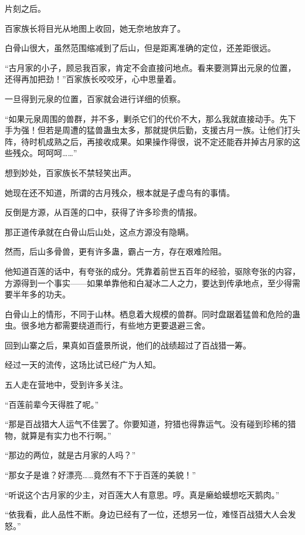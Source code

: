 
\begin{this_body}

片刻之后。

百家族长将目光从地图上收回，她无奈地放弃了。

白骨山很大，虽然范围缩减到了后山，但是距离准确的定位，还差距很远。

“古月家的小子，顾忌我百家，肯定不会直接问地点。看来要测算出元泉的位置，还得再加把劲！”百家族长咬咬牙，心中思量着。

一旦得到元泉的位置，百家就会进行详细的侦察。

“如果元泉周围的兽群，并不多，剿杀它们的代价不大，那么我就直接动手。先下手为强！但若是周遭的猛兽蛊虫太多，那就提供后勤，支援古月一族。让他们打头阵，待时机成熟之后，再接收成果。如果操作得很，说不定还能吞并掉古月家的这些残众。呵呵呵……”

想到妙处，百家族长不禁轻笑出声。

她现在还不知道，所谓的古月残众，根本就是子虚乌有的事情。

反倒是方源，从百莲的口中，获得了许多珍贵的情报。

那正道传承就在白骨山后山处，这点方源没有隐瞒。

然而，后山多骨兽，更有许多蛊，霸占一方，存在艰难险阻。

他知道百莲的话中，有夸张的成分。凭靠着前世五百年的经验，驱除夸张的内容，方源得到一个事实——如果单靠他和白凝冰二人之力，要达到传承地点，至少得需要半年多的功夫。

白骨山上的情形，不同于山林。栖息着大规模的兽群。同时盘踞着猛兽和危险的蛊虫。很多地方都需要绕道而行，有些地方更要退避三舍。

回到山寨之后，果真如百盛景所说，他们的战绩超过了百战猎一筹。

经过一天的流传，这场比试已经广为人知。

五人走在营地中，受到许多关注。

“百莲前辈今天得胜了呢。”

“那是百战猎大人运气不佳罢了。你要知道，狩猎也得靠运气。没有碰到珍稀的猎物，就算是有实力也不行啊。”

“那边的两位，就是古月家的人吗？”

“那女子是谁？好漂亮……竟然有不下于百莲的美貌！”

“听说这个古月家的少主，对百莲大人有意思。哼。真是癞蛤蟆想吃天鹅肉。”

“依我看，此人品性不断。身边已经有了一位，还想另一位，难怪百战猎大人会发怒。”


\end{this_body}
